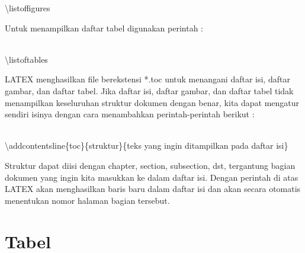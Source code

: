 \textbackslash listoffigures \\[0.5 cm]


\begin{raggedleft} Untuk menampilkan daftar tabel digunakan perintah :\end{raggedleft}\\[0.5 cm]



\textbackslash listoftables\\[0.5 cm]


\begin{raggedleft} LATEX menghasilkan file berekstensi *.toc untuk menangani daftar isi, daftar gambar, dan daftar tabel. Jika daftar isi, daftar gambar, dan daftar tabel tidak menampilkan keseluruhan struktur dokumen dengan benar, kita dapat mengatur sendiri isinya dengan cara menambahkan perintah-perintah berikut :\end{raggedleft}\\[0.5 cm]



\textbackslash addcontentsline\{toc\}\{struktur\}\{teks yang ingin ditampilkan pada daftar isi\}\\[0.5 cm]


\begin{raggedleft} Struktur dapat diisi dengan chapter, section, subsection, dst, tergantung bagian dokumen yang ingin kita masukkan ke dalam daftar isi. Dengan perintah di atas LATEX akan menghasilkan baris baru dalam daftar isi dan akan secara otomatis menentukan nomor halaman bagian tersebut.\end{raggedleft}
\section{Tabel}
